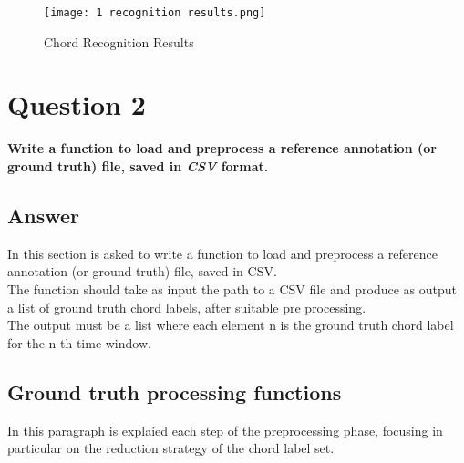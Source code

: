 \documentclass{article}
\begin{document}
\begin{figure}[H]
 \centering
 \texttt{[image: 1 recognition results.png]}
 \caption{Chord Recognition Results}
\end{figure}


\section*{\color{red}Question 2}

\begin{problem}
	\textbf{Write a function to load and preprocess a reference annotation (or ground truth) file, saved in \emph{CSV} format.}
\end{problem}

\subsection*{\color{blue}Answer}

In this section is asked to write a function to load and preprocess a reference annotation (or ground truth) file, saved in CSV. \\
The function should take as input the path to a CSV file and produce as output a list of ground truth chord labels, after suitable pre processing.\\
The output must be a list where each element
n is the ground truth chord label for the n-th time window.

\subsection*{Ground truth processing functions}

In this paragraph is explaied each step of the preprocessing phase, focusing in particular on the reduction strategy of the chord label set.
\end{document}
